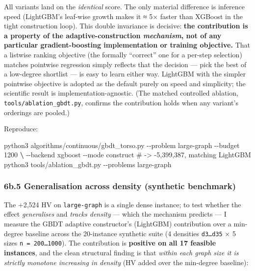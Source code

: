 \documentclass[
  11pt,
]{article}
\newenvironment{Shaded}{}{}
\newcommand{\ExtensionTok}[1]{#1}
\newcommand{\KeywordTok}[1]{\textcolor[rgb]{0.00,0.44,0.13}{\textbf{#1}}}
\newcommand{\NormalTok}[1]{#1}
\newcommand{\OperatorTok}[1]{\textcolor[rgb]{0.40,0.40,0.40}{#1}}
\begin{document}
All variants land on the \emph{identical} score. The only material
difference is inference speed (LightGBM's leaf-wise growth makes it ≈ 5×
faster than XGBoost in the tight construction loop). This double
invariance is decisive: \textbf{the contribution is a property of the
adaptive-construction \emph{mechanism}, not of any particular
gradient-boosting implementation or training objective.} That a listwise
ranking objective (the formally ``correct'' one for a per-step
selection) matches pointwise regression simply reflects that the
decision --- pick the best of a low-degree shortlist --- is easy to
learn either way. LightGBM with the simpler pointwise objective is
adopted as the default purely on speed and simplicity; the scientific
result is implementation-agnostic. (The matched controlled ablation,
\texttt{tools/ablation\_gbdt.py}, confirms the contribution holds when
any variant's orderings are pooled.)

Reproduce:

\begin{Shaded}
\begin{Highlighting}[]
\ExtensionTok{python3}\NormalTok{ algorithms/continuous/gbdt\_torso.py {-}{-}problem large{-}graph {-}{-}budget 1200 }\KeywordTok{\textbackslash{}}
        \ExtensionTok{{-}{-}backend}\NormalTok{ xgboost {-}{-}mode construct      \# {-}}\OperatorTok{\textgreater{}}\NormalTok{ {-}5,399,387, matching LightGBM}
\ExtensionTok{python3}\NormalTok{ tools/ablation\_gbdt.py {-}{-}problems large{-}graph}
\end{Highlighting}
\end{Shaded}

\hypertarget{b.5-generalisation-across-density-synthetic-benchmark}{%
\subsubsection{6b.5 Generalisation across density (synthetic
benchmark)}\label{b.5-generalisation-across-density-synthetic-benchmark}}

The +2,524 HV on \texttt{large-graph} is a single dense instance; to
test whether the effect \emph{generalises} and \emph{tracks density} ---
which the mechanism predicts --- I measure the GBDT adaptive
constructor's (LightGBM) contribution over a min-degree baseline across
the 20-instance synthetic suite (4 densities \texttt{d3\ldots{}d35} × 5
sizes \texttt{n\ =\ 200\ldots{}1000}). The contribution is
\textbf{positive on all 17 feasible instances}, and the clean structural
finding is that \emph{within each graph size it is strictly monotone
increasing in density} (HV added over the min-degree baseline):
\end{document}
